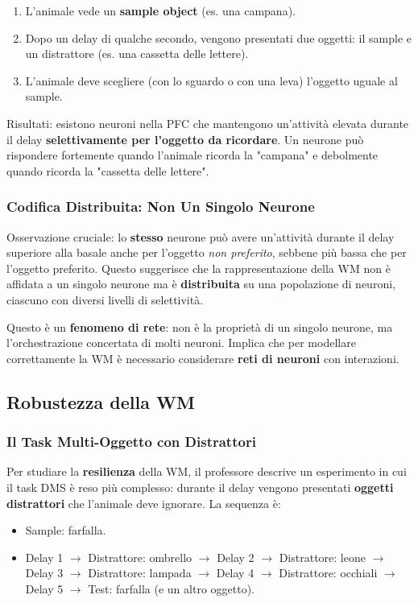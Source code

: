 \begin{enumerate}
    \item L'animale vede un \textbf{sample object} (es. una campana).
    \item Dopo un delay di qualche secondo, vengono presentati due oggetti: il sample e un distrattore (es. una cassetta delle lettere).
    \item L'animale deve scegliere (con lo sguardo o con una leva) l'oggetto uguale al sample.
\end{enumerate}

Risultati: esistono neuroni nella PFC che mantengono un'attività elevata durante il delay \textbf{selettivamente per l'oggetto da ricordare}. Un neurone può rispondere fortemente quando l'animale ricorda la "campana" e debolmente quando ricorda la "cassetta delle lettere".

\subsubsection{Codifica Distribuita: Non Un Singolo Neurone}

Osservazione cruciale: lo \textbf{stesso} neurone può avere un'attività durante il delay superiore alla basale anche per l'oggetto \textit{non preferito}, sebbene più bassa che per l'oggetto preferito. Questo suggerisce che la rappresentazione della WM non è affidata a un singolo neurone ma è \textbf{distribuita} su una popolazione di neuroni, ciascuno con diversi livelli di selettività.

Questo è un \textbf{fenomeno di rete}: non è la proprietà di un singolo neurone, ma l'orchestrazione concertata di molti neuroni. Implica che per modellare correttamente la WM è necessario considerare \textbf{reti di neuroni} con interazioni.


\subsection{Robustezza della WM}

\subsubsection{Il Task Multi-Oggetto con Distrattori}

Per studiare la \textbf{resilienza} della WM, il professore descrive un esperimento in cui il task DMS è reso più complesso: durante il delay vengono presentati \textbf{oggetti distrattori} che l'animale deve ignorare. La sequenza è:
\begin{itemize}
    \item Sample: farfalla.
    \item Delay 1 $\rightarrow$ Distrattore: ombrello $\rightarrow$ Delay 2 $\rightarrow$ Distrattore: leone $\rightarrow$ Delay 3 $\rightarrow$ Distrattore: lampada $\rightarrow$ Delay 4 $\rightarrow$ Distrattore: occhiali $\rightarrow$ Delay 5 $\rightarrow$ Test: farfalla (e un altro oggetto).
\end{itemize}


